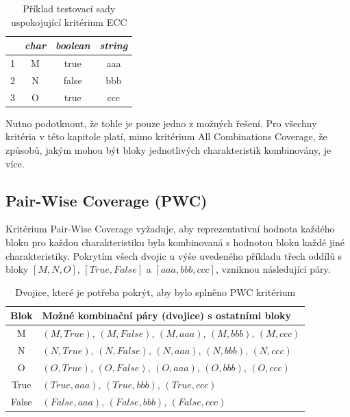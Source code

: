 \begin{table}[h!]
\centering
\begin{tabular}{ |c|c c c| } 
 \hline
 & \textit{char} & \textit{boolean} & \textit{string} \\
 \hline
1 & M & true & aaa \\
2 & N & false & bbb \\
3 & O & true & ccc \\
 \hline
\end{tabular}
\caption{Příklad testovací sady uspokojující kritérium ECC}
\label{table_ecc}
\end{table}

Nutno podotknout, že tohle je pouze jedno z možných řešení. Pro všechny kritéria v této kapitole platí, mimo kritérium All Combinations Coverage, že způsobů, jakým mohou být bloky jednotlivých charakteristik kombinovány, je více. 



\subsection*{Pair-Wise Coverage (PWC)}
\label{subsec_pwc}

Kritérium Pair-Wise Coverage vyžaduje, aby reprezentativní hodnota každého bloku pro každou charakteristiku byla kombinovaná s hodnotou bloku každé jiné charakteristiky. Pokrytím všech dvojic u výše uvedeného příkladu třech oddílů s bloky $[M,N,O]$, $[True, False]$ a $[aaa,bbb,ccc]$, vzniknou následující páry.


\begin{table}[h!]
\centering
\begin{tabular}{ |c|l| } 
 \hline
Blok & Možné kombinační páry (dvojice) s ostatními bloky \\
 \hline
 M & $(M, True)$, $(M, False)$, $(M, aaa)$, $(M, bbb)$, $(M, ccc)$ \\
 N & $(N, True)$, $(N, False)$, $(N, aaa)$, $(N, bbb)$, $(N, ccc)$ \\
 O & $(O, True)$, $(O, False)$, $(O, aaa)$, $(O, bbb)$, $(O, ccc)$ \\
 True & $(True, aaa)$, $(True, bbb)$, $(True, ccc)$ \\
 False & $(False, aaa)$, $(False,bbb)$, $(False,ccc)$ \\
 \hline
\end{tabular}
\caption{Dvojice, které je potřeba pokrýt, aby bylo splněno PWC kritérium}
\label{table_pwc}
\end{table}

